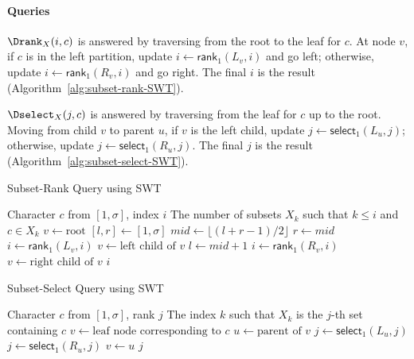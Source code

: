 \paragraph{Queries}
$\Drank_X(i, c)$ is answered by traversing from the root to the leaf for $c$. At node $v$, if $c$ is in the left partition, update $i \leftarrow \textsf{rank}_1(L_v, i)$ and go left; otherwise, update $i \leftarrow \textsf{rank}_1(R_v, i)$ and go right. The final $i$ is the result (Algorithm~\ref{alg:subset-rank-SWT}).

$\Dselect_X(j, c)$ is answered by traversing from the leaf for $c$ up to the root. Moving from child $v$ to parent $u$, if $v$ is the left child, update $j \leftarrow \textsf{select}_1(L_u, j)$; otherwise, update $j \leftarrow \textsf{select}_1(R_u, j)$. The final $j$ is the result (Algorithm~\ref{alg:subset-select-SWT}).


\begin{algorithm}[hbtp]
    \caption{Subset-Rank Query using SWT {\cite{SubsetWT}}}
    \label{alg:subset-rank-SWT}
    \small
    \begin{algorithmic}[1] %
        \Require Character $c$ from $[1, \sigma]$, index $i$
        \Ensure The number of subsets $X_k$ such that $k \leq i$ and $c \in X_k$
        \State $v \gets \text{root}$
        \State $[l, r] \gets [1, \sigma]$
        \State $mid \gets \lfloor (l+r-1)/2 \rfloor$
        \State $r \gets mid$
        \State $i \gets \textsf{rank}_1(L_v, i)$
        \State $v \gets \text{left child of } v$
        \Else
        \State $l \gets mid + 1$
        \State $i \gets \textsf{rank}_1(R_v, i)$
        \State $v \gets \text{right child of } v$
        \EndIf
        \EndWhile
        \State \Return $i$
        \EndFunction
    \end{algorithmic}
\end{algorithm}

\begin{algorithm}[hbtp]
    \caption{Subset-Select Query using SWT {\cite{SubsetWT}}}
    \label{alg:subset-select-SWT}
    \small
    \begin{algorithmic}[1] %
        \Require Character $c$ from $[1, \sigma]$, rank $j$
        \Ensure The index $k$ such that $X_k$ is the $j$-th set containing $c$
        \State $v \gets \text{leaf node corresponding to } c$
        \State $u \gets \text{parent of } v$
        \State $j \gets \textsf{select}_1(L_u, j)$
        \Else
        \State $j \gets \textsf{select}_1(R_u, j)$
        \EndIf
        \State $v \gets u$
        \EndWhile
        \State \Return $j$
        \EndFunction
    \end{algorithmic}
\end{algorithm}

